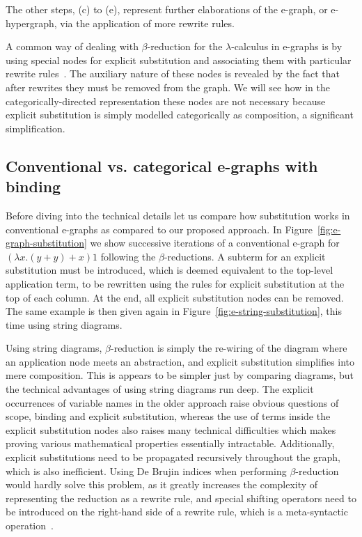 \documentclass[]{IEEEtran}
\begin{document}
The other steps, (c) to (e), represent further elaborations of the e-graph, or e-hypergraph, via the application of more rewrite rules.

A common way of dealing with $\beta$-reduction for the $\lambda$-calculus in e-graphs is by using special nodes for explicit substitution and associating them with particular rewrite rules~\cite{EggPaper,koehler2022sketchguided}.
The auxiliary nature of these nodes is revealed by the fact that after rewrites they must be removed from the graph. 
We will see how in the categorically-directed representation these nodes are not necessary because explicit substitution is simply modelled categorically as composition, a significant simplification.

\subsection{Conventional vs. categorical e-graphs with binding}

Before diving into the technical details let us compare how substitution works in conventional e-graphs as compared to our proposed approach.
In Figure~\ref{fig:e-graph-substitution} we show successive iterations of a conventional e-graph for $(\lambda x . (y + y) + x) 1$ following the $\beta$-reductions.
A subterm for an explicit substitution must be introduced, which is deemed equivalent to the top-level application term, to be rewritten using the rules for explicit substitution at the top of each column.
At the end, all explicit substitution nodes can be removed.
The same example is then given again in Figure~\ref{fig:e-string-substitution}, this time using string diagrams. 

Using string diagrams, $\beta$-reduction is simply the re-wiring of the diagram where an application node meets an abstraction, and explicit substitution simplifies into mere composition. 
This is appears to be simpler just by comparing diagrams, but the technical advantages of using string diagrams run deep. 
The explicit occurrences of variable names in the older approach raise obvious questions of scope, binding and explicit substitution, whereas the use of terms inside the explicit substitution nodes also raises many technical difficulties which makes proving various mathematical properties essentially intractable. 
Additionally, explicit substitutions need to be propagated recursively throughout the graph, which is also inefficient. 
Using De Brujin indices when performing $\beta$-reduction would hardly solve this problem, as it greatly increases the complexity of representing the reduction as a rewrite rule, and special shifting operators need to be introduced on the right-hand side of a rewrite rule, which is a meta-syntactic operation~\cite{koehler2022sketchguided}.
\end{document}
